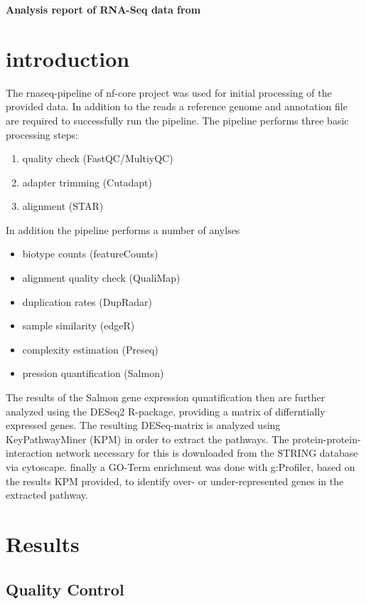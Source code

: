 \documentclass{article}
\begin{document}
\begin{center}
\huge
\textbf{Analysis report of RNA-Seq data from }
\end{center}

\section{introduction}
The rnaseq-pipeline of nf-core project was used for initial processing of the provided data. In addition to the reads a reference genome and annotation file are required to successfully run the pipeline. The pipeline performs three basic processing steps:
\begin{enumerate}
\item quality check (FastQC/MultiyQC)
\item adapter trimming (Cutadapt)
\item alignment (STAR)
\end{enumerate}
\bigskip
In addition the pipeline performs a number of anylses
\bigskip
\begin{itemize}
\item biotype counts (featureCounts)
\item alignment quality check (QualiMap)
\item duplication rates (DupRadar)
\item sample similarity (edgeR)
\item complexity estimation (Preseq)
\item pression quantification (Salmon)
\end{itemize}
\bigskip
The results of the Salmon gene expression qunatification then are further analyzed using the DESeq2 R-package, providing a matrix of differntially expressed genes.
\bigskip
The resulting DESeq-matrix is analyzed using KeyPathwayMiner (KPM) in order to extract the pathways. The protein-protein-interaction network necessary for this is downloaded from the STRING database via cytoscape.
\bigskip
finally a GO-Term enrichment was done with g:Profiler, based on the results KPM provided, to identify over- or under-represented genes in the extracted pathway.
\bigskip

\newpage

\section*{Results}	
\subsection*{Quality Control}
\FloatBarrier
\end{document}
